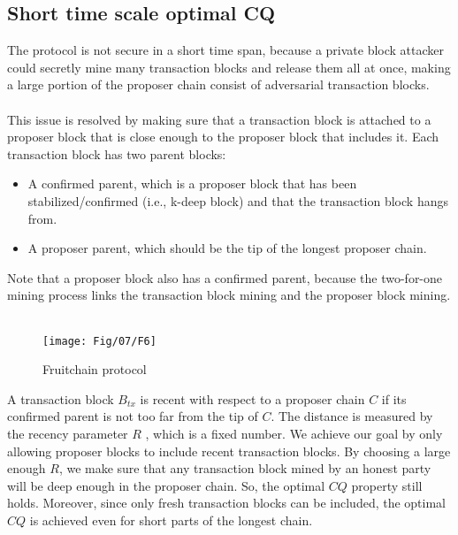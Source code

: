 \subsection{Short time scale optimal CQ}
The protocol is not secure in a short time span, because a private block attacker could secretly mine many transaction blocks and release them all at once, making a large portion of the proposer chain consist of adversarial transaction blocks.\\\\
This issue is resolved by making sure that a transaction block is attached to a proposer block that is close enough to the proposer block that includes it. Each transaction block has two parent blocks:
\begin{itemize}
	\item A confirmed parent, which is a proposer block that has been stabilized/confirmed (i.e., k-deep block) and that the transaction block hangs from.
	\item A proposer parent, which should be the tip of the longest proposer chain.
\end{itemize}
Note that a proposer block also has a confirmed parent, because the two-for-one mining process links the transaction block mining and the proposer block mining.\\\\
\begin{figure}[h!]
	\centering
	\texttt{[image: Fig/07/F6]}
	\caption{Fruitchain protocol}
	\label{fig:l7_f6}
\end{figure}
A transaction block $B_{tx}$ is recent with respect to a proposer chain $C$ if its confirmed parent is not too far from the tip of $C$. The distance is measured by the recency parameter $R$ , which is a fixed number. We achieve our goal by only allowing proposer blocks to include recent transaction blocks. By choosing a large enough $R$, we make sure that any transaction block mined by an honest party will be deep enough in the proposer chain. So, the optimal $CQ$ property still holds. Moreover, since only fresh transaction blocks can be included, the optimal $CQ$ is achieved even for short parts of the longest chain.
